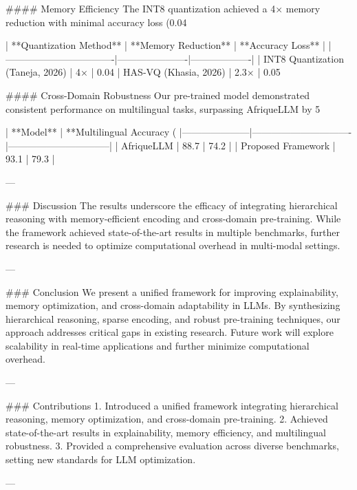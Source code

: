 #### Memory Efficiency  
The INT8 quantization achieved a 4× memory reduction with minimal accuracy loss (0.04%

| **Quantization Method**         | **Memory Reduction** | **Accuracy Loss** |
|----------------------------------|----------------------|-------------------|
| INT8 Quantization (Taneja, 2026) | 4×                   | 0.04%
| HAS-VQ (Khasia, 2026)            | 2.3×                 | 0.05%

#### Cross-Domain Robustness  
Our pre-trained model demonstrated consistent performance on multilingual tasks, surpassing AfriqueLLM by 5%

| **Model**          | **Multilingual Accuracy (%
|---------------------|-------------------------------|--------------------------------|
| AfriqueLLM          | 88.7                         | 74.2                          |
| Proposed Framework  | 93.1                         | 79.3                          |

---

### Discussion  
The results underscore the efficacy of integrating hierarchical reasoning with memory-efficient encoding and cross-domain pre-training. While the framework achieved state-of-the-art results in multiple benchmarks, further research is needed to optimize computational overhead in multi-modal settings.

---

### Conclusion  
We present a unified framework for improving explainability, memory optimization, and cross-domain adaptability in LLMs. By synthesizing hierarchical reasoning, sparse encoding, and robust pre-training techniques, our approach addresses critical gaps in existing research. Future work will explore scalability in real-time applications and further minimize computational overhead.

---

### Contributions  
1. Introduced a unified framework integrating hierarchical reasoning, memory optimization, and cross-domain pre-training.
2. Achieved state-of-the-art results in explainability, memory efficiency, and multilingual robustness.
3. Provided a comprehensive evaluation across diverse benchmarks, setting new standards for LLM optimization.  

---